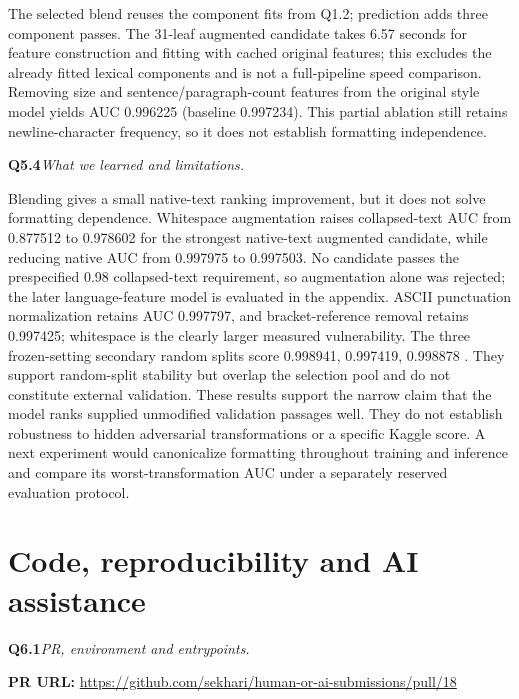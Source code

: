 \documentclass[10pt,letterpaper]{article}
\newcommand{\q}[2]{\needspace{4\baselineskip}\par\addvspace{7pt}\textbf{#1}\quad\textit{#2}\par\nobreak}
\begin{document}
The selected blend reuses the component fits from Q1.2; prediction adds three component passes.
The 31-leaf augmented candidate takes
6.57
 seconds for feature construction and fitting with cached original features; this excludes the already fitted lexical components and is not a full-pipeline speed comparison.
Removing size and sentence/paragraph-count features from the original style model yields AUC
0.996225
 (baseline 0.997234). This partial ablation still retains newline-character frequency, so it does not establish formatting independence.
\q{Q5.4}{What we learned and limitations.}
Blending gives a small native-text ranking improvement, but it does not solve formatting dependence.
Whitespace augmentation raises collapsed-text AUC from 0.877512 to 0.978602 for the strongest native-text augmented candidate, while reducing native AUC from 0.997975 to 0.997503.
No candidate passes the prespecified 0.98 collapsed-text requirement, so augmentation alone was rejected; the later language-feature model is evaluated in the appendix.
ASCII punctuation normalization retains AUC 0.997797, and bracket-reference removal retains 0.997425; whitespace is the clearly larger measured vulnerability.
The three frozen-setting secondary random splits score
0.998941, 0.997419, 0.998878
. They support random-split stability but overlap the selection pool and do not constitute external validation.
These results support the narrow claim that the model ranks supplied unmodified validation passages well.
They do not establish robustness to hidden adversarial transformations or a specific Kaggle score.
A next experiment would canonicalize formatting throughout training and inference and compare its worst-transformation AUC under a separately reserved evaluation protocol.
\newpage
\section{Code, reproducibility and AI assistance}
\q{Q6.1}{PR, environment and entrypoints.}
\textbf{PR URL:}
\url{https://github.com/sekhari/human-or-ai-submissions/pull/18}
\end{document}
